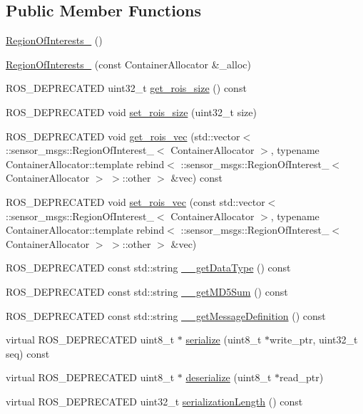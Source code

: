 \subsection*{Public Member Functions}
\begin{DoxyCompactItemize}
\item 
\hyperlink{structsocial__robot_1_1RegionOfInterests___a8e3719b7289040dbce91029308426d1d}{RegionOfInterests\_\-} ()
\item 
\hyperlink{structsocial__robot_1_1RegionOfInterests___a1eeaf1724e711d7badb84b6548cf78bf}{RegionOfInterests\_\-} (const ContainerAllocator \&\_\-alloc)
\item 
ROS\_\-DEPRECATED uint32\_\-t \hyperlink{structsocial__robot_1_1RegionOfInterests___a6740bb05496add8b97e3bf94bff4b9af}{get\_\-rois\_\-size} () const 
\item 
ROS\_\-DEPRECATED void \hyperlink{structsocial__robot_1_1RegionOfInterests___a23f551dd5898a5fabd6af746ba4a658a}{set\_\-rois\_\-size} (uint32\_\-t size)
\item 
ROS\_\-DEPRECATED void \hyperlink{structsocial__robot_1_1RegionOfInterests___ae0221ee438ffcc558e4629b51230b6c2}{get\_\-rois\_\-vec} (std::vector$<$ ::sensor\_\-msgs::RegionOfInterest\_\-$<$ ContainerAllocator $>$, typename ContainerAllocator::template rebind$<$ ::sensor\_\-msgs::RegionOfInterest\_\-$<$ ContainerAllocator $>$ $>$::other $>$ \&vec) const 
\item 
ROS\_\-DEPRECATED void \hyperlink{structsocial__robot_1_1RegionOfInterests___ad9f0ddeec75b0c2a9922941fe9f45bcc}{set\_\-rois\_\-vec} (const std::vector$<$ ::sensor\_\-msgs::RegionOfInterest\_\-$<$ ContainerAllocator $>$, typename ContainerAllocator::template rebind$<$ ::sensor\_\-msgs::RegionOfInterest\_\-$<$ ContainerAllocator $>$ $>$::other $>$ \&vec)
\item 
ROS\_\-DEPRECATED const std::string \hyperlink{structsocial__robot_1_1RegionOfInterests___a5064ede85ae1dab081b84f6d19070376}{\_\-\_\-getDataType} () const 
\item 
ROS\_\-DEPRECATED const std::string \hyperlink{structsocial__robot_1_1RegionOfInterests___ad74ffca1d153777b741887fd1506438f}{\_\-\_\-getMD5Sum} () const 
\item 
ROS\_\-DEPRECATED const std::string \hyperlink{structsocial__robot_1_1RegionOfInterests___ae30b59434e53419e80a04f26d51c28ca}{\_\-\_\-getMessageDefinition} () const 
\item 
virtual ROS\_\-DEPRECATED uint8\_\-t $\ast$ \hyperlink{structsocial__robot_1_1RegionOfInterests___a97418470f8dd424d30a3b441d3202341}{serialize} (uint8\_\-t $\ast$write\_\-ptr, uint32\_\-t seq) const 
\item 
virtual ROS\_\-DEPRECATED uint8\_\-t $\ast$ \hyperlink{structsocial__robot_1_1RegionOfInterests___af093b8c6c0c454673009553040c564db}{deserialize} (uint8\_\-t $\ast$read\_\-ptr)
\item 
virtual ROS\_\-DEPRECATED uint32\_\-t \hyperlink{structsocial__robot_1_1RegionOfInterests___ad2c2cdef56b5c47648c81feba25b8cae}{serializationLength} () const 
\end{DoxyCompactItemize}
